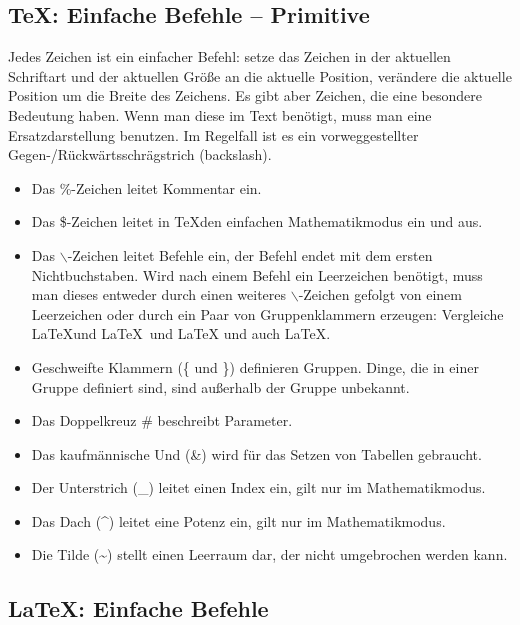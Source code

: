 \documentclass[ngerman,               %
               a4paper,               %
               fleqn,                 %
                     ]{scrartcl}       %
\begin{document}
\subsection{\TeX: Einfache Befehle -- Primitive} %

Jedes Zeichen ist ein einfacher Befehl: setze das Zeichen in der
aktuellen Schriftart und der aktuellen Größe an die aktuelle
Position, verändere die aktuelle Position um die Breite des Zeichens.
Es gibt aber Zeichen, die eine besondere Bedeutung haben. Wenn man
diese im Text benötigt, muss man eine Ersatzdarstellung benutzen. Im
Regelfall ist es ein vorweggestellter Gegen-/Rückwärtsschrägstrich
(backslash).
\begin{itemize}                 %
  \item Das \%-Zeichen leitet Kommentar ein.
  \item Das \$-Zeichen leitet in \TeX den einfachen Mathematikmodus ein und
    aus.
  \item Das \(\backslash\)-Zeichen leitet Befehle ein, der Befehl endet mit
    dem ersten Nichtbuchstaben. Wird nach einem Befehl ein Leerzeichen
    benötigt, muss man dieses entweder durch einen weiteres
    \(\backslash\)-Zeichen gefolgt von einem Leerzeichen oder durch ein
    Paar von Gruppenklammern erzeugen: Vergleiche \LaTeX und \LaTeX\ und
    \LaTeX{} und auch \LaTeX.
  \item Geschweifte Klammern (\{ und \}) definieren Gruppen. Dinge, die in
    einer Gruppe definiert sind, sind außerhalb der Gruppe unbekannt.
  \item Das Doppelkreuz \# beschreibt Parameter.
  \item Das kaufmännische Und (\&) wird für das Setzen von Tabellen
    gebraucht.
  \item Der Unterstrich (\_) leitet einen Index ein, gilt nur im
    Mathematikmodus.
  \item Das Dach (\^{}) leitet eine Potenz ein, gilt nur im
    Mathematikmodus.
  \item Die Tilde (\~{}) stellt einen Leerraum dar, der nicht umgebrochen
    werden kann.
\end{itemize}

\subsection{\LaTeX: Einfache Befehle}
\end{document}
